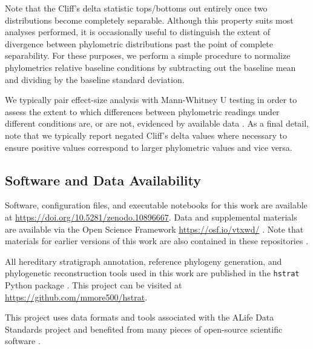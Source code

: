 Note that the Cliff's delta statistic tops/bottoms out entirely once two distributions become completely separable.
Although this property suits most analyses performed, it is occasionally useful to distinguish the extent of divergence between phylometric distributions past the point of complete separability.
For these purposes, we perform a simple procedure to normalize phylometrics relative baseline conditions by subtracting out the baseline mean and dividing by the baseline standard deviation.

We typically pair effect-size analysis with Mann-Whitney U testing in order to assess the extent to which differences between phylometric readings under different conditions are, or are not, evidenced by available data \citep{mann1947on}.
As a final detail, note that we typically report negated Cliff's delta values where necessary to ensure positive values correspond to larger phylometric values and vice versa.

\subsection{Software and Data Availability}

Software, configuration files, and executable notebooks for this work are available at \url{https://doi.org/10.5281/zenodo.10896667}.
Data and supplemental materials are available via the Open Science Framework \url{https://osf.io/vtxwd/} \citep{foster2017open}.
Note that materials for earlier versions of this work are also contained in these repositories \citep{moreno2023toward}.

All hereditary stratigraph annotation, reference phylogeny generation, and phylogenetic reconstruction tools used in this work are published in the \texttt{hstrat} Python package \citep{moreno2022hstrat}.
This project can be visited at \url{https://github.com/mmore500/hstrat}.

This project uses data formats and tools associated with the ALife Data Standards project \citep{lalejini2019data} and benefited from many pieces of open-source scientific software \citep{ofria2020empirical,sand2014tqdist,2020SciPy-NMeth,harris2020array,reback2020pandas,mckinney-proc-scipy-2010,sukumaran2010dendropy,cock2009biopython,dolson2024phylotrackpy,torchiano2016effsize,waskom2021seaborn,hunter2007matplotlib,moreno2024apc,moreno2024qspool,moreno2023teeplot,hagen2021gen3sis,ofria2004avida,torchiano2016effsize}.
